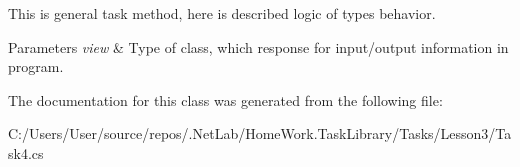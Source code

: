 This is general task method, here is described logic of types behavior. 


\begin{DoxyParams}{Parameters}
{\em view} & Type of class, which response for input/output information in program.\\
\hline
\end{DoxyParams}


The documentation for this class was generated from the following file\+:\begin{DoxyCompactItemize}
\item 
C\+:/\+Users/\+User/source/repos/.\+Net\+Lab/\+Home\+Work.\+Task\+Library/\+Tasks/\+Lesson3/Task4.\+cs\end{DoxyCompactItemize}
